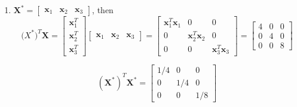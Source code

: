 \documentclass{article}
\begin{document}
\begin{enumerate}[leftmargin = 0 em, label = \arabic*., font = \bfseries]
\begin{enumerate}
	\item 
	$\bm X^* = \begin{bmatrix}
		\bm x_1 & \bm x_2 & \bm x_3
	\end{bmatrix}$, then 
	\[\bm (X^*)^T \bm X = \begin{bmatrix}
		\bm x_1^T \\
		\bm x_2^T \\
		\bm x_3^T
	\end{bmatrix}\begin{bmatrix}
		\bm x_1 & \bm x_2 & \bm x_3
	\end{bmatrix} = \begin{bmatrix}
		\bm x_1^T \bm x_1 & 0 & 0\\
		0 & \bm x_2^T \bm x_2 & 0 \\
		0 & 0 & \bm x_3^T \bm x_3
	\end{bmatrix} = \begin{bmatrix}
		4 & 0 & 0\\
		0 & 4 & 0 \\
		0 & 0 & 8
	\end{bmatrix}\]

	\[(\bm X^*)^T \bm X^* = \begin{bmatrix}
		1/4 & 0 & 0\\
		0 & 1/4 & 0\\
		0 & 0 & 1/8
	\end{bmatrix}\]


\end{enumerate}
\end{enumerate}
\end{document}
